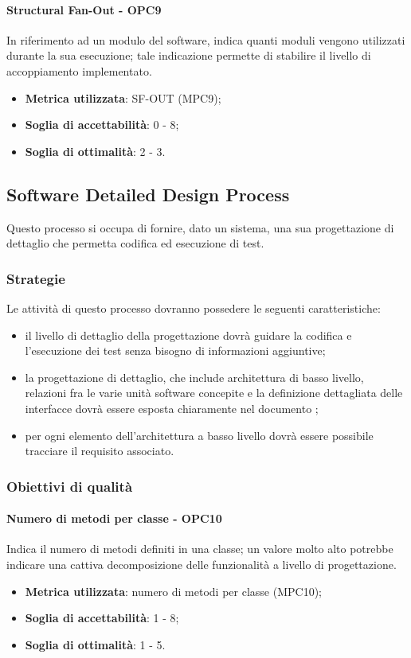 \documentclass[PdQ.tex]{subfiles}
\begin{document}
			\paragraph{Structural Fan-Out - OPC9}
			In riferimento ad un modulo del software, indica quanti moduli vengono utilizzati durante la
			sua esecuzione; tale indicazione permette di stabilire il livello di accoppiamento implementato.
			\begin{itemize}
					\item \textbf{Metrica utilizzata}: SF-OUT (MPC9);
					\item \textbf{Soglia di accettabilità}: 0 - 8;
					\item \textbf{Soglia di ottimalità}: 2 - 3.
			\end{itemize}

	\subsection{Software Detailed Design Process}
		Questo processo si occupa di fornire, dato un sistema, una sua progettazione di dettaglio che permetta codifica ed esecuzione di test.

		\subsubsection{Strategie}
			Le attività di questo processo dovranno possedere le seguenti caratteristiche:
			\begin{itemize}
			\item il livello di dettaglio della progettazione dovrà guidare la codifica e l'esecuzione dei test senza bisogno di informazioni aggiuntive;
			\item la progettazione di dettaglio, che include architettura di basso livello,  relazioni fra le varie unità software concepite e la definizione dettagliata delle interfacce dovrà essere esposta chiaramente nel documento \DPdoc{};
			\item per ogni elemento dell'architettura a basso livello dovrà essere possibile tracciare il requisito associato.
			\end{itemize}

		\subsubsection{Obiettivi di qualità}
			\paragraph{Numero di metodi per classe - OPC10}
			Indica il numero di metodi definiti in una classe; un valore molto alto potrebbe indicare una cattiva decomposizione delle funzionalità a livello di progettazione.
			\begin{itemize}
				\item \textbf{Metrica utilizzata}: numero di metodi per classe (MPC10);
				\item \textbf{Soglia di accettabilità}: 1 -  8;
				\item \textbf{Soglia di ottimalità}: 1 - 5.
			\end{itemize}
\end{document}
